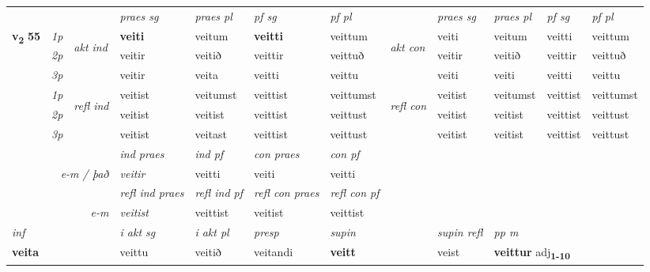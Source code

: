 \begin{longtable}[l]{X>{\footnotesize\itshape}llXXXXlXXXX}
 & &   & \textit{praes sg}  & \textit{praes pl}    & \textit{ pf sg} & \textit{pf pl} & & \textit{praes sg}  & \textit{praes pl}    & \textit{pf sg} & \textit{pf pl }  \\ \cmidrule{4-7} \cmidrule{9-12}
 \multirow{2}{*}{{{\textbf{v{\textsubscript{2}}} \Large{\textbf{55}}}}}  & 1p & \multirow{3}{*}{\begin{turn}{90}\textit{akt ind}\end{turn}} & \textbf{veiti} & veitum & \textbf{veitti} & veittum & \multirow{3}{*}{\begin{turn}{90}\textit{akt con}\end{turn}} &veiti & veitum & veitti & veittum\\*
 & 2p &  &  veitir  & veitið & veittir & veittuð & & veitir & veitið & veittir & veittuð \\*
 & 3p &  & veitir & veita & veitti & veittu & & veiti & veiti& veitti & veittu \\*
\cmidrule{4-7} \cmidrule{9-12}
 & 1p & \multirow{3}{*}{\begin{turn}{90}\textit{refl ind}\end{turn}}  & veitist & veitumst & veittist & veittumst & \multirow{3}{*}{\begin{turn}{90}\textit{refl con}\end{turn}}  &veitist & veitumst & veittist & veittumst \\*
 & 2p &  & veitist & veitist & veittist & veittust & &veitist & veitist & veittist & veittust \\*
 & 3p  & & veitist & veitast & veittist & veittust & & veitist & veitist& veittist & veittust \\*
\cmidrule{4-7} \cmidrule{9-12}

   && &  \textit{ind praes} & \textit{ind pf} & \textit{con praes} & \textit{con pf} \\*
\multicolumn{3}{r}{\textit{e-m / það}} & veitir & veitti & veiti & veitti \\*

\cmidrule{4-7}
 & && \textit{refl ind praes} & \textit{refl ind pf} & \textit{refl con praes} & \textit{refl con pf} \\*
\multicolumn{3}{r}{\textit{e-m}}& veitist & veittist & veitist & veittist \\*

\cmidrule{4-7}
   {\textit{inf}} & &  & \textit{i akt sg} & \textit{i akt pl}   & \textit{presp} & \textit{supin} && \textit{supin refl} & \textit{pp m} \\*
  {\textbf{veita}} & && veittu  & veitið   & veitandi &  \textbf{veitt} && veist & \multicolumn{2}{l}{\textbf{veittur} adj\textbf{\textsubscript{1-10}}} \\*


\end{longtable}
